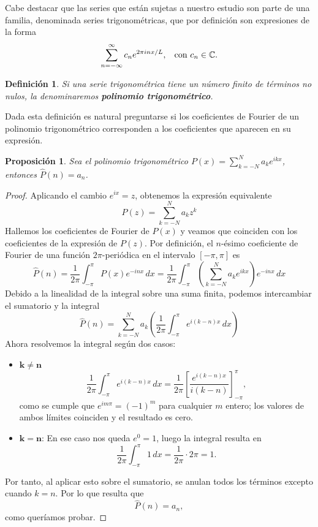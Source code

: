 \documentclass[12pt]{article}
\theoremstyle{plain}
\newtheorem{proposicion}[teorema]{Proposición}
\newtheorem{definicion}[teorema]{\textbf{Definición}}
\theoremstyle{definition}
\numberwithin{equation}{section}
\begin{document}
        Cabe destacar que las series que están sujetas a nuestro estudio son parte de una familia, denominada series trigonométricas, que por definición son expresiones de la forma
        \begin{equation*}
            \sum_{n = -\infty}^{\infty} c_n e^{2\pi inx/L}, \hspace{3mm} \text{con}\ c_n \in \mathbb{C}.
        \end{equation*}
        \begin{definicion}
            Si una serie trigonométrica tiene un número finito de términos no nulos, la denominaremos \textbf{polinomio trigonométrico}.
        \end{definicion}
        Dada esta definición es natural preguntarse si los coeficientes de Fourier de un polinomio trigonométrico corresponden a los coeficientes que aparecen en su expresión.
        \begin{proposicion}
            \label{coefpol}
            Sea el polinomio trigonométrico \(P(x) = \sum_{k=-N}^{N}a_ke^{ikx}\), entonces \(\hat{P}(n) = a_n\).
        \end{proposicion}
        \begin{proof}
            Aplicando el cambio \(e^{ix} = z\), obtenemos la expresión equivalente
            $$ P(z) = \sum_{k=-N}^{N}a_kz^{k} $$
            Hallemos los coeficientes de Fourier de $P(x)$ y veamos que coinciden con los coeficientes de la expresión de \(P(z)\). Por definición, el \(n\)-ésimo coeficiente de Fourier de una función \(2\pi\)-periódica en el intervalo \([-\pi,\pi]\) es
            \begin{equation*}
                \hat{P}(n) = \frac{1}{2\pi} \int_{-\pi}^{\pi} P(x)e^{-inx} \,dx =  \frac{1}{2\pi} \int_{-\pi}^{\pi} \left(\sum_{k=-N}^{N}a_ke^{ikx}\right)  e^{-inx} \,dx
            \end{equation*}
            Debido a la linealidad de la integral sobre una suma finita, podemos intercambiar el sumatorio y la integral
            \begin{equation*}
                \hat{P}(n) = \sum_{k=-N}^{N} a_k \left(\frac{1}{2\pi} \int_{-\pi}^{\pi}  e^{i(k-n)x}\,dx \right)  
            \end{equation*}
            Ahora resolvemos la integral según dos casos:
            \begin{itemize}
                \item $\boldsymbol{k \neq n}$
                $$\frac{1}{2\pi} \int_{-\pi}^{\pi}  e^{i(k-n)x}  \,dx = \frac{1}{2\pi} \left[\frac{e^{i(k-n)x}}{i(k-n)}\right]_{-\pi}^{\pi}, $$
                como se cumple que \(e^{im\pi} = (-1)^m\) para cualquier \(m\) entero; los valores de ambos límites coinciden y el resultado es cero.
                \item $\boldsymbol{k = n}$: En ese caso nos queda \(e^0 = 1\), luego la integral resulta en
                $$\frac{1}{2\pi} \int_{-\pi}^{\pi}  1 \,dx = \frac{1}{2\pi} \cdot 2\pi = 1 .$$
            \end{itemize}
            Por tanto, al aplicar esto sobre el sumatorio, se anulan todos los términos excepto cuando \(k = n\). Por lo que resulta que
            $$\hat{P}(n) = a_n,$$
            como queríamos probar.
        \end{proof}
\end{document}
